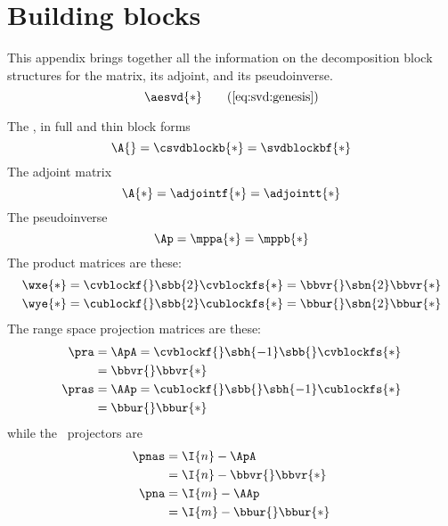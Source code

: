 \chapter{Building blocks}

This appendix brings together all the information on the decomposition block structures for the matrix, its adjoint, and its pseudoinverse.
\begin{equation*}
  \aesvd{*}
  \tag{\ref{eq:svd:genesis}}
\end{equation*}

The \asvd, in full and thin block forms
\begin{equation}
  \A{} = \csvdblockb{*} = \svdblockbf{*}
\end{equation}
%
The adjoint matrix
%
\begin{equation}
  \A{*} = \adjointf{*} = \adjointt{*}
\end{equation}
%
The pseudoinverse
%
\begin{equation}
  \Ap = \mppa{*} = \mppb{*}
\end{equation}
%
The product matrices are these:
\begin{equation}
  \begin{split}
    \wxe{*} &= \cvblockf{} \sbb{2} \cvblockfs{*} = \bbvr{} \sbn{2} \bbvr{*} \\
    \wye{*} &= \cublockf{} \sbb{2} \cublockfs{*} = \bbur{} \sbn{2} \bbur{*}
  \end{split}
\end{equation}
%
The range space projection matrices are these:
\begin{equation}
  \begin{split}
    \pra  &= \ApA = \cvblockf{} \sbh{-1} \sbb{} \cvblockfs{*} \\
          &= \bbvr{} \bbvr{*} \\
    \pras &= \AAp = \cublockf{} \sbb{} \sbh{-1} \cublockfs{*} \\
          &= \bbur{} \bbur{*}
  \end{split}
\end{equation}
while the \ns \ projectors are
  \begin{equation}
    \begin{split}
      \pnas &= \I{n} - \ApA \\
            &= \I{n} - \bbvr{} \bbvr{*} \\
      \pna  &= \I{m} - \AAp \\
            &= \I{m} - \bbur{} \bbur{*}
    \end{split}
  \end{equation}


\endinput
